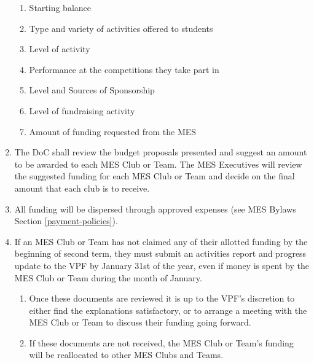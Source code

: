 \begin{enumerate}
  \begin{enumerate}
   \item
    Starting balance
   \item
    Type and variety of activities offered to students
   \item
    Level of activity
   \item
    Performance at the competitions they take part in
   \item
    Level and Sources of Sponsorship
   \item
    Level of fundraising activity
   \item
    Amount of funding requested from the MES
  \end{enumerate}
 \item
  The DoC shall review the budget proposals presented and suggest an amount to be awarded to each MES Club or Team. The MES Executives will review the suggested funding for each MES Club or Team and decide on the final amount that each club is to receive.
 \item
  All funding will be dispersed through approved expenses (see MES Bylaws Section \ref{payment-policies}). %
 \item
  If an MES Club or Team has not claimed any of their allotted funding by the beginning of second term, they must submit an activities report and progress update to the VPF by January 31st of the year, even if money is spent by the MES Club or Team during the month of January.

  \begin{enumerate}
   \item
    Once these documents are reviewed it is up to the VPF's discretion to either find the explanations satisfactory, or to arrange a meeting with the MES Club or Team to discuss their funding going forward.
   \item
    If these documents are not received, the MES Club or Team's funding will be reallocated to other MES Clubs and Teams.

  \end{enumerate}
\end{enumerate}

